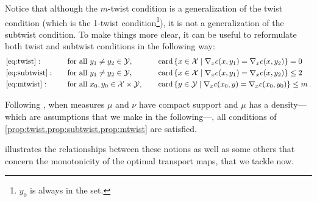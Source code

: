         \begin{remark}
            Notice that although the $m$-twist condition is a generalization of the twist condition (which is the 1-twist condition\footnote{$y_0$ is always in the set.}), it is not a generalization of the subtwist condition. To make things more clear, it can be useful to reformulate both twist and subtwist conditions in the following way:
            \begin{alignat*}{3}
                & \cref{eq:twist}:  \quad &  &  \text{for all }y_{1}\neq y_{2}\in \mathcal{Y}, \quad &  &   \card\left\{ x \in \mathcal{X}\mid \nabla_{x}c(x,y_{1})=\nabla_{x}c(x,y_{2}) \right\}=0\\
                & \cref{eq:subtwist}: \quad  &  &  \text{for all }y_{1}\neq y_{2}\in \mathcal{Y},\quad  &  &   \card\left\{ x \in \mathcal{X}\mid \nabla_{x}c(x,y_{1})=\nabla_{x}c(x,y_{2}) \right\}\leq 2\\
                & \cref{eq:mtwist}: \quad  &  &  \text{for all }x_{0},y_{0}\in \mathcal{X}\times\mathcal{Y}, \quad &  &   \card\left\{ y \in \mathcal{Y}\mid \nabla_{x}c(x_{0},y)=\nabla_{x}c(x_{0},y_{0}) \right\}\leq m\,.
            \end{alignat*}
        \end{remark}
        \begin{remark}
            Following \cite[Rem.~10.33]{villani2009optimal}, when measures $\mu$ and $\nu$ have compact support and $\mu$ has a density---which are assumptions that we make in the following---, all conditions of \cref{prop:twist,prop:subtwist,prop:mtwist} are satisfied.
        \end{remark}
         illustrates the relationships between these notions as well as some others that concern the monotonicity of the optimal transport maps, that we tackle now.

